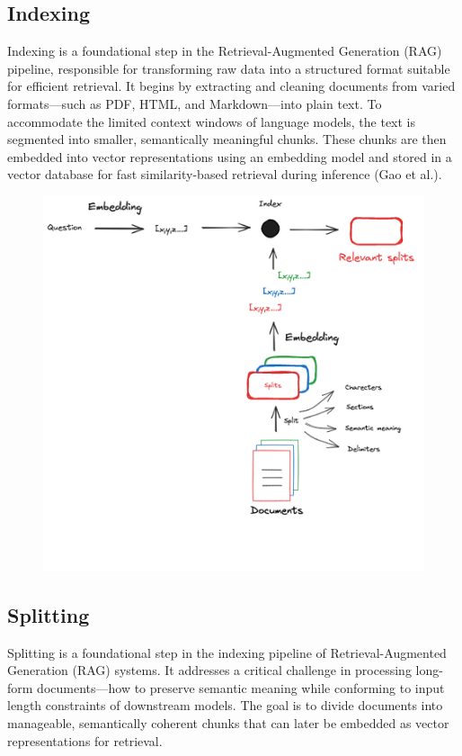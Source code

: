 \documentclass[twocolumn, 10pt]{article}
\begin{document}
\subsection{Indexing}
Indexing is a foundational step in the Retrieval-Augmented Generation (RAG) pipeline, responsible for transforming raw data into a structured format suitable for efficient retrieval. It begins by extracting and cleaning documents from varied formats—such as PDF, HTML, and Markdown—into plain text. To accommodate the limited context windows of language models, the text is segmented into smaller, semantically meaningful chunks. These chunks are then embedded into vector representations using an embedding model and stored in a vector database for fast similarity-based retrieval during inference (Gao et al.).
\begin{figure}[H]
    \centering
     \includegraphics[width=\linewidth]{firstimage.jpg}
    \caption{}
    \label{fig:indexing-process}
\end{figure}


\subsection{Splitting}

Splitting is a foundational step in the indexing pipeline of Retrieval-Augmented Generation (RAG) systems. It addresses a critical challenge in processing long-form documents—how to preserve semantic meaning while conforming to input length constraints of downstream models. The goal is to divide documents into manageable, semantically coherent chunks that can later be embedded as vector representations for retrieval.
\end{document}
